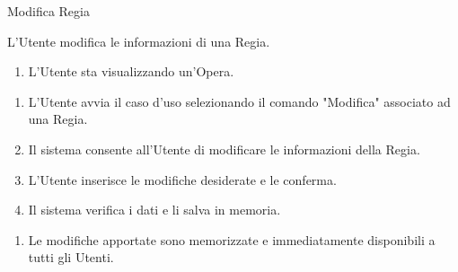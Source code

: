 {\ucExtTable	%
{	%
	Modifica Regia
	
}{	%
	
}{	%
	L'Utente modifica le informazioni di una Regia.
	
}{	%
	\attori
	
}{	%
	\begin{enumerate}
        \item L'Utente sta visualizzando un'Opera.
    \end{enumerate}
	
}{	%
    \begin{enumerate}
        \item L'Utente avvia il caso d'uso selezionando il comando "Modifica" associato ad una Regia.
        \item Il sistema consente all'Utente di modificare le informazioni della Regia.
        \item L'Utente inserisce le modifiche desiderate e le conferma.
        \item Il sistema verifica i dati e li salva in memoria.
    \end{enumerate}
	
}{	%
	\begin{enumerate}
        \item Le modifiche apportate sono memorizzate e immediatamente disponibili a tutti gli Utenti.
    \end{enumerate}
	
} }

